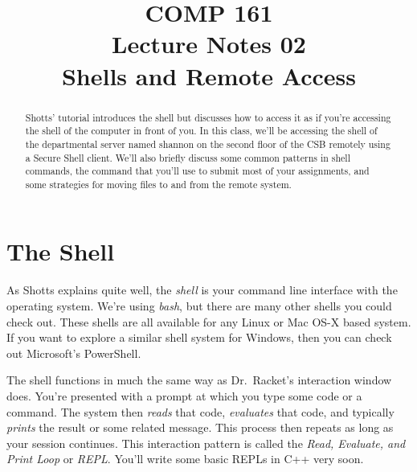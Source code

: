 \documentclass[nobib]{tufte-handout}
\title{COMP 161 \\ Lecture Notes 02 \\ Shells and Remote Access}
\begin{document}
\maketitle

\begin{abstract}
Shotts' tutorial introduces the shell but discusses how to access it as if you're accessing the shell of the computer in front of you.  In this class, we'll be accessing the shell of the departmental server named shannon on the second floor of the CSB remotely using a Secure Shell client. We'll also briefly discuss some common patterns in shell commands, the command that you'll use to submit most of your assignments, and some strategies for moving files to and from the remote system.
\end{abstract}

\section{The Shell}

As Shotts explains quite well, the \textit{shell} is your command line interface with the operating system.  We're using \textit{bash}, but there are many other shells you could check out.  These shells are all available for any Linux or Mac OS-X based system. If you want to explore a similar shell system for Windows, then you can check out Microsoft's PowerShell.

The shell functions in much the same way as Dr.\ Racket's interaction window does. You're presented with a prompt at which you type some code or a command. The system then \textit{reads} that code, \textit{evaluates} that code, and typically \textit{prints} the result or some related message. This process then repeats as long as your session continues. This interaction pattern is called the \textit{Read, Evaluate, and Print Loop} or \textit{REPL}. You'll write some basic REPLs in C++ very soon.
\end{document}

